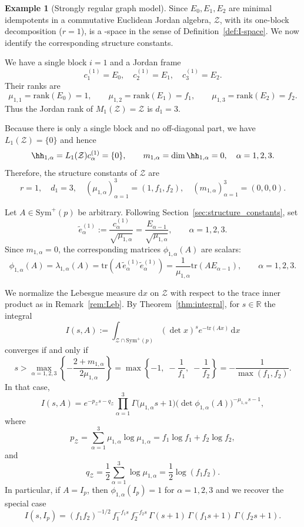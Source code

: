 \documentclass[12pt]{amsart}
\theoremstyle{plain}
\theoremstyle{definition}
\newtheorem{example}[theorem]{Example}
\theoremstyle{remark}
\newcommand{\1}{\mathbf{1}}
\newcommand{\dd}{\mathrm{d}}
\begin{document}
\begin{example}[Strongly regular graph model]
Since $E_0,E_1,E_2$ are minimal idempotents in a commutative Euclidean Jordan algebra, 
$\mathcal{Z}$, with its one-block decomposition ($r=1$), is a \cBC-space in the sense of Definition~\ref{def:I-space}. We now identify the corresponding structure constants.

We have a single block $i=1$ and a Jordan frame
\[
c^{(1)}_1 = E_0,\quad c^{(1)}_2 = E_1,\quad c^{(1)}_3 = E_2.
\]
Their ranks are
\[
\mu_{1,1} = \mathrm{rank}(E_0) = 1,\qquad
\mu_{1,2} = \mathrm{rank}(E_1) = f_1,\qquad
\mu_{1,3} = \mathrm{rank}(E_2) = f_2.
\]
Thus the Jordan rank of $M_1(\mathcal{Z})=\mathcal{Z}$ is $d_1 = 3$.

Because there is only a single block and no off-diagonal part, we have
$L_1(\mathcal{Z})=\{0\}$ and hence
\[
\hh_{1,\alpha} = L_1(\mathcal{Z}) c^{(1)}_\alpha = \{0\},\qquad
m_{1,\alpha} = \dim \hh_{1,\alpha} = 0,\quad \alpha=1,2,3.
\]
Therefore, the structure constants of $\mathcal{Z}$ are
\[
r=1,\quad
d_1 = 3,\quad
(\mu_{1,\alpha})_{\alpha=1}^3 = (1,f_1,f_2),
\quad
(m_{1,\alpha})_{\alpha=1}^3 = (0,0,0).
\]

Let $A\in\mathrm{Sym}^+(p)$ be arbitrary.
Following Section~\ref{sec:structure_constants}, set
\[
\tilde e^{(1)}_\alpha 
:= \frac{c^{(1)}_\alpha}{\sqrt{\mu_{1,\alpha}}}
= \frac{E_{\alpha-1}}{\sqrt{\mu_{1,\alpha}}},\qquad \alpha=1,2,3.
\]
Since $m_{1,\alpha}=0$, the corresponding matrices $\phi_{1,\alpha}(A)$
are scalars:
\[
\phi_{1,\alpha}(A) 
= \lambda_{1,\alpha}(A) 
= \mathrm{tr}(A\,\tilde e^{(1)}_\alpha \tilde e^{(1)}_\alpha)
= \frac{1}{\mu_{1,\alpha}}\mathrm{tr}(A E_{\alpha-1}),
\qquad \alpha=1,2,3.
\]

We normalize the Lebesgue measure $\dd x$ on $\mathcal{Z}$ 
with respect to the trace inner product as in Remark~\ref{rem:Leb}. 
By Theorem~\ref{thm:integral}, for $s\in\mathbb{R}$ the integral
\[
I(s,A)
:= \int_{\mathcal{Z}\cap\mathrm{Sym}^+(p)} (\det x)^s e^{-\mathrm{tr}(Ax)} \,\dd x
\]
converges if and only if
\[
s > \max_{\alpha=1,2,3} \left\{-\frac{2 + m_{1,\alpha}}{2\mu_{1,\alpha}}\right\}
= \max\left\{
-1,\; -\frac{1}{f_1},\; -\frac{1}{f_2}
\right\}
= -\frac{1}{\max(f_1,f_2)}.
\]
In that case,
\[
I(s,A)
= e^{-p_{\mathcal{Z}}s-q_{\mathcal{Z}}}
  \prod_{\alpha=1}^3
  \Gamma\bigl(\mu_{1,\alpha}s + 1\bigr)
  \bigl(\det \phi_{1,\alpha}(A)\bigr)^{-\mu_{1,\alpha}s - 1},
\]
where
\[
p_{\mathcal{Z}}
= \sum_{\alpha=1}^3 \mu_{1,\alpha}\log\mu_{1,\alpha}
= f_1\log f_1 + f_2\log f_2,
\]
and
\[
q_{\mathcal{Z}}
= \frac12 \sum_{\alpha=1}^3 \log\mu_{1,\alpha}
= \frac12\log(f_1f_2).
\]
In particular, if $A=I_p$, then $\phi_{1,\alpha}(I_p)= 1$ for $\alpha=1,2,3$ and we recover the special case
\[
I(s,I_p)
= (f_1f_2)^{-1/2}\, f_1^{-f_1s}\,f_2^{-f_2s}\,
   \Gamma(s+1)\,\Gamma(f_1s+1)\,\Gamma(f_2s+1).
\]
\end{example}
\end{document}
